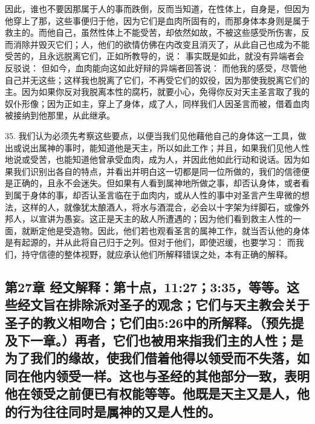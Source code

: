 因此，谁也不要因那属于人的事而跌倒，反而当知道，在性体上，自身是，但因为他穿上了那，这些事便归于他，因为它们是血肉所固有的，而那身体本身则是属于救主的。而他自己，虽然性体上不能受苦，却依然如故，不被这些感受所伤害，反而消除并毁灭它们；人，他们的欲情仿佛在内改变且消灭了，从此自己也成为不能受苦的，且永远脱离它们，正如所教导的，说： 事实既是如此，就没有异端者会反驳说： 但如今，血肉能向这如此好辩的异端者回答说： 而他我的感受，尽管他自己并无这些；这样我也脱离了它们，不再受它们的奴役，因为那使我脱离它们的主。因为如果你反对我脱离本性的腐朽，就要小心，免得你反对天主圣言取了我的奴仆形像；因为正如主，穿上了身体，成了人，同样我们人因圣言而被，借着血肉被接纳到他那里，从此继承。\par

35. 我们认为必须先考察这些要点，以便当我们见他藉他自己的身体这一工具，做出或说出属神的事时，能知道他是天主，所以如此工作；并且，如果我们见他人性地说或受苦，也能知道他曾承受血肉，成为人，并因此他如此行动和说话。因为如果我们识别出各自的特点，并看出并明白这一切都是同一位所做的，我们的信德便是正确的，且永不会迷失。但如果有人看到属神地所做之事，却否认身体，或者看到属于身体的事，却否认圣言临在于血肉内，或从人性的事中对圣言产生卑微的想法，这样的人，就像犹太酿酒人，将水与酒混合，必会以十字架为绊脚石，或像外邦人，以宣讲为愚妄。这正是天主的敌人所遭遇的；因为他们看到救主人性的一面，就断定他是受造物。因此，他们若也观看圣言的属神工作，就当否认他的身体是有起源的，并从此将自己归于之列。但对于他们，即使迟缓，也要学习： 而我们，持守信德的整体视野，就应承认他们所解释错误之处，本有正确的解释。\par


\subsection{第27章 经文解释：第十点，11:27；3:35，等等。这些经文旨在排除派对圣子的观念；它们与天主教会关于圣子的教义相吻合；它们由5:26中的所解释。（预先提及下一章。）再者，它们也被用来指我们主的人性；是为了我们的缘故，使我们借着他得以领受而不失落，如同在他内领受一样。这也与圣经的其他部分一致，表明他在领受之前便已有权能等等。他既是天主又是人，他的行为往往同时是属神的又是人性的。}

